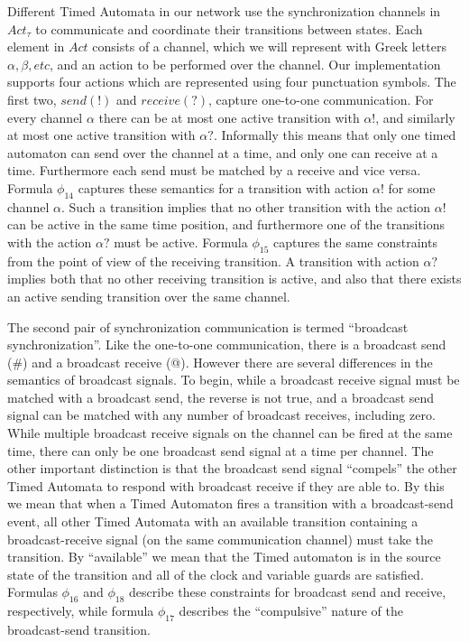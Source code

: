\documentclass[a4paper,12pt]{article}
\begin{document}
Different Timed Automata in our network use the synchronization channels in
\(Act_\tau\) to communicate and coordinate their transitions between states.
Each element in \(Act\) consists of a channel, which we will represent with
Greek letters \(\alpha, \beta, etc\), and an action to be performed over the
channel. Our implementation supports four actions which are represented using
four punctuation symbols. The first two, \(send(!)\) and \(receive(?)\), capture
one-to-one communication. For every channel \(\alpha\) there can be at most one
active transition with \(\alpha!\), and similarly at most one active transition
with \(\alpha?\). Informally this means that only one timed automaton can send
over the channel at a time, and only one can receive at a time. Furthermore each
send must be matched by a receive and vice versa. Formula \(\phi_{14}\) captures
these semantics for a transition with action \(\alpha!\) for some channel
\(\alpha\). Such a transition implies that no other transition with the action
\(\alpha!\) can be active in the same time position, and furthermore one of the
transitions with the action \(\alpha?\) must be active. Formula \(\phi_{15}\)
captures the same constraints from the point of view of the receiving
transition. A transition with action \(\alpha?\) implies both that no other
receiving transition is active, and also that there exists an active sending
transition over the same channel.

The second pair of synchronization communication is termed ``broadcast
synchronization''. Like the one-to-one communication, there is a broadcast send
(\#) and a broadcast receive (@). However there are several differences in the
semantics of broadcast signals. To begin, while a broadcast receive signal must
be matched with a broadcast send, the reverse is not true, and a broadcast send
signal can be matched with any number of broadcast receives, including zero.
While multiple broadcast receive signals on the channel can be fired at the same
time, there can only be one broadcast send signal at a time per channel. The
other important distinction is that the broadcast send signal ``compels'' the
other Timed Automata to respond with broadcast receive if they are able to. By
this we mean that when a Timed Automaton fires a transition with a broadcast-send event, all other Timed Automata with an available transition containing
a broadcast-receive signal (on the same communication channel) must take the
transition. By ``available'' we mean that the Timed automaton is in the source
state of the transition and all of the clock and variable guards are satisfied.
Formulas \(\phi_{16}\) and \(\phi_{18}\) describe these constraints for
broadcast send and receive, respectively, while formula \(\phi_{17}\) describes
the ``compulsive'' nature of the broadcast-send transition.
\end{document}
